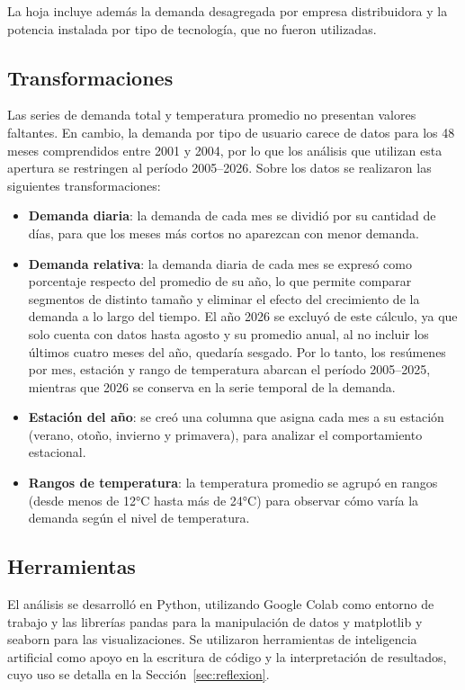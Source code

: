 \documentclass[10pt,a4paper]{article}
\begin{document}
La hoja incluye además la demanda desagregada por empresa distribuidora y la potencia instalada por tipo de tecnología, que no fueron utilizadas.

\subsection{Transformaciones}
Las series de demanda total y temperatura promedio no presentan valores faltantes. En cambio, la demanda por tipo de usuario carece de datos para los 48 meses comprendidos entre 2001 y 2004, por lo que los análisis que utilizan esta apertura se restringen al período 2005--2026. Sobre los datos se realizaron las siguientes transformaciones:

\begin{itemize}
  \item \textbf{Demanda diaria}: la demanda de cada mes se dividió por su cantidad de días, para que los meses más cortos no aparezcan con menor demanda.
  \item \textbf{Demanda relativa}: la demanda diaria de cada mes se expresó como porcentaje respecto del promedio de su año, lo que permite comparar segmentos de distinto tamaño y eliminar el efecto del crecimiento de la demanda a lo largo del tiempo. El año 2026 se excluyó de este cálculo, ya que solo cuenta con datos hasta agosto y su promedio anual, al no incluir los últimos cuatro meses del año, quedaría sesgado. Por lo tanto, los resúmenes por mes, estación y rango de temperatura abarcan el período 2005--2025, mientras que 2026 se conserva en la serie temporal de la demanda.
  \item \textbf{Estación del año}: se creó una columna que asigna cada mes a su estación (verano, otoño, invierno y primavera), para analizar el comportamiento estacional.
  \item \textbf{Rangos de temperatura}: la temperatura promedio se agrupó en rangos (desde menos de 12°C hasta más de 24°C) para observar cómo varía la demanda según el nivel de temperatura.
\end{itemize}

\subsection{Herramientas}
El análisis se desarrolló en Python, utilizando Google Colab como entorno de trabajo y las librerías pandas para la manipulación de datos y matplotlib y seaborn para las visualizaciones. Se utilizaron herramientas de inteligencia artificial como apoyo en la escritura de código y la interpretación de resultados, cuyo uso se detalla en la Sección~\ref{sec:reflexion}.
\end{document}
